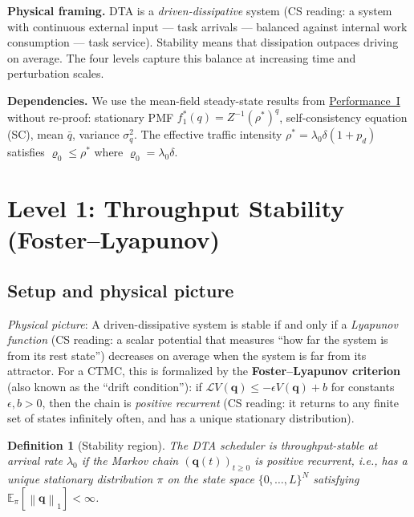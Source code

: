 \documentclass[11pt,a4paper]{article}
\newtheorem{definition}{Definition}[section]
\newcommand{\norm}[1]{\left\lVert #1 \right\rVert}
\newcommand{\rhostar}{\rho^{*}}
\newcommand{\rhozero}{\varrho_0}
\newcommand{\lambdazero}{\lambda_0}
\newcommand{\pd}{p_d}
\newcommand{\qbar}{\bar{q}}
\newcommand{\generator}{\mathcal{L}}
\begin{document}
\noindent\textbf{Physical framing.}
DTA is a \emph{driven-dissipative} system
(CS reading: a system with continuous external input --- task arrivals ---
balanced against internal work consumption --- task service).
Stability means that dissipation outpaces driving on average.
The four levels capture this balance at increasing time and perturbation scales.

\noindent\textbf{Dependencies.}
We use the mean-field steady-state results from \hyperref[chap:load_balance]{Performance~I}
without re-proof: stationary PMF $f_1^*(q) = Z^{-1}(\rhostar)^q$,
self-consistency equation (SC), mean $\qbar$, variance $\sigma_q^2$.
The effective traffic intensity $\rhostar = \lambdazero\delta(1+\pd)$
satisfies $\rhozero \leq \rhostar$ where $\rhozero = \lambdazero\delta$.

\section{Level 1: Throughput Stability (Foster--Lyapunov)}

\subsection{Setup and physical picture}

\emph{Physical picture}:
A driven-dissipative system is stable if and only if a
\emph{Lyapunov function} (CS reading: a scalar potential that measures
``how far the system is from its rest state'') decreases on average
when the system is far from its attractor.
For a CTMC, this is formalized by the \textbf{Foster--Lyapunov criterion}
(also known as the ``drift condition''):
if $\generator V(\mathbf{q}) \leq -\epsilon V(\mathbf{q}) + b$
for constants $\epsilon, b > 0$, then the chain is
\emph{positive recurrent} (CS reading: it returns to any finite set
of states infinitely often, and has a unique stationary distribution).

\begin{definition}[Stability region]
\label{def:stable}
The DTA scheduler is \emph{throughput-stable} at arrival rate
$\lambdazero$ if the Markov chain $(\mathbf{q}(t))_{t\geq 0}$
is positive recurrent, i.e., has a unique stationary distribution
$\pi$ on the state space $\{0,\ldots,L\}^N$ satisfying
$\mathbb{E}_\pi[\norm{\mathbf{q}}_1] < \infty$.
\end{definition}
\end{document}
